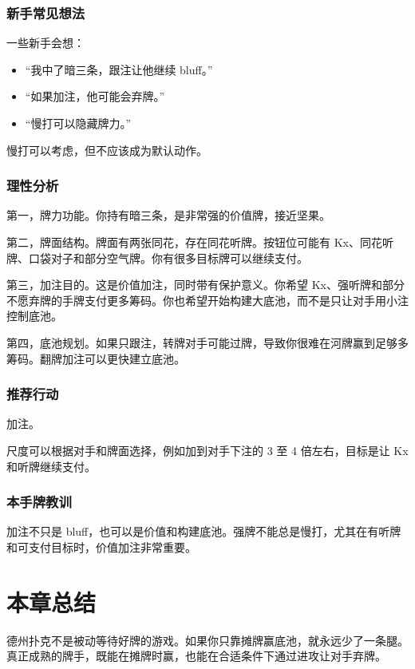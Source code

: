 \subsubsection*{新手常见想法}

一些新手会想：

\begin{itemize}
\item “我中了暗三条，跟注让他继续 bluff。”
\item “如果加注，他可能会弃牌。”
\item “慢打可以隐藏牌力。”
\end{itemize}

慢打可以考虑，但不应该成为默认动作。

\subsubsection*{理性分析}

第一，牌力功能。你持有暗三条，是非常强的价值牌，接近坚果。

第二，牌面结构。牌面有两张同花，存在同花听牌。按钮位可能有 Kx、同花听牌、口袋对子和部分空气牌。你有很多目标牌可以继续支付。

第三，加注目的。这是价值加注，同时带有保护意义。你希望 Kx、强听牌和部分不愿弃牌的手牌支付更多筹码。你也希望开始构建大底池，而不是只让对手用小注控制底池。

第四，底池规划。如果只跟注，转牌对手可能过牌，导致你很难在河牌赢到足够多筹码。翻牌加注可以更快建立底池。

\subsubsection*{推荐行动}

加注。

尺度可以根据对手和牌面选择，例如加到对手下注的 3 至 4 倍左右，目标是让 Kx 和听牌继续支付。

\subsubsection*{本手牌教训}

加注不只是 bluff，也可以是价值和构建底池。强牌不能总是慢打，尤其在有听牌和可支付目标时，价值加注非常重要。

\section{本章总结}

德州扑克不是被动等待好牌的游戏。如果你只靠摊牌赢底池，就永远少了一条腿。真正成熟的牌手，既能在摊牌时赢，也能在合适条件下通过进攻让对手弃牌。

